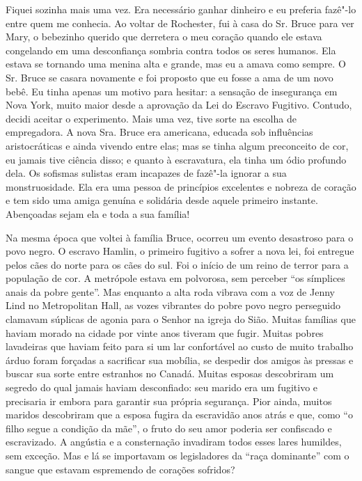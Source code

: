 Fiquei sozinha mais uma vez. Era
necessário ganhar dinheiro e eu preferia fazê"-lo entre quem me conhecia.
Ao voltar de Rochester, fui à casa do Sr. Bruce para ver Mary, o
bebezinho querido que derretera o meu coração quando ele estava
congelando em uma desconfiança sombria contra todos os seres humanos.
Ela estava se tornando uma menina alta e grande, mas eu a amava como
sempre. O Sr. Bruce se casara novamente e foi proposto que eu fosse a
ama de um novo bebê. Eu tinha apenas um motivo para hesitar: a sensação
de insegurança em Nova York, muito maior desde a aprovação da Lei do
Escravo Fugitivo. Contudo, decidi aceitar o experimento. Mais uma vez,
tive sorte na escolha de empregadora. A nova Sra. Bruce era americana,
educada sob influências aristocráticas e ainda vivendo entre elas; mas
se tinha algum preconceito de cor, eu jamais tive ciência disso; e
quanto à escravatura, ela tinha um ódio profundo dela. Os sofismas
sulistas eram incapazes de fazê"-la ignorar a sua monstruosidade. Ela era
uma pessoa de princípios excelentes e nobreza de coração e tem sido uma
amiga genuína e solidária desde aquele primeiro instante. Abençoadas
sejam ela e toda a sua família!

Na mesma época que voltei à família
Bruce, ocorreu um evento desastroso para o povo negro. O escravo Hamlin,
o primeiro fugitivo a sofrer a nova lei, foi entregue pelos cães do
norte para os cães do sul. Foi o início de um reino de terror para a
população de cor. A metrópole estava em polvorosa, sem perceber ``os
símplices anais da pobre gente''. Mas enquanto a alta roda vibrava com a
voz de Jenny Lind no Metropolitan Hall, as vozes vibrantes do pobre povo
negro perseguido clamavam súplicas de agonia para o Senhor na igreja do
Sião. Muitas famílias que haviam morado na cidade por vinte anos tiveram
que fugir. Muitas pobres lavadeiras que haviam feito para si um lar
confortável ao custo de muito trabalho árduo foram forçadas a sacrificar
sua mobília, se despedir dos amigos às pressas e buscar sua sorte entre
estranhos no Canadá. Muitas esposas descobriram um segredo do qual
jamais haviam desconfiado: seu marido era um fugitivo e precisaria ir
embora para garantir sua própria segurança. Pior ainda, muitos maridos
descobriram que a esposa fugira da escravidão anos atrás e que, como ``o
filho segue a condição da mãe'', o fruto do seu amor poderia ser
confiscado e escravizado. A angústia e a consternação invadiram todos
esses lares humildes, sem exceção. Mas e lá se importavam os
legisladores da ``raça dominante'' com o sangue que estavam espremendo
de corações sofridos?


